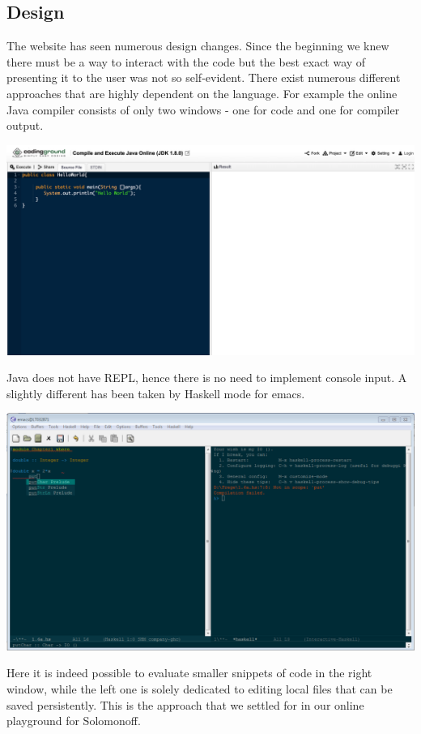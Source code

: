 \subsection{Design}

The website has seen numerous design changes. Since the beginning we knew there must be a way to interact with the code but the best exact way of presenting it to the user was not so self-evident. There exist numerous different approaches that are highly dependent on the language. For example the online  Java  compiler consists of only two windows - one for code and one for compiler output.
\begin{center}
\includegraphics[scale=0.3]{java.png}
\end{center}
Java does not have REPL, hence there is no need to implement console input.
A slightly different has been taken by Haskell mode for emacs. 
\begin{center}
	\includegraphics[scale=0.45]{haskell.png}
\end{center}
Here it is indeed possible to evaluate smaller snippets of code in the right window, while the left one is solely dedicated to editing local files that can be saved persistently. This is the approach that we settled for in our online playground for Solomonoff. 
